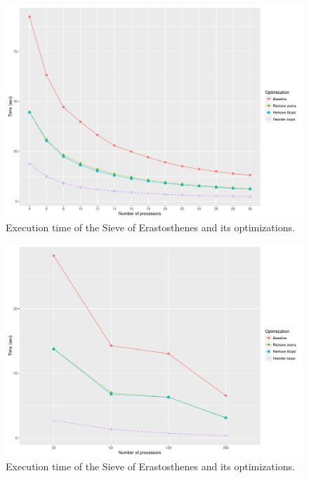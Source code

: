 \documentclass[10pt]{scrartcl}
\begin{document}
\begin{figure}
  \centering
  \includegraphics[width=\textwidth]{plot}
  \caption{Execution time of the Sieve of Erastosthenes and its optimizations.}\label{fig:plot}
\end{figure}

\begin{figure}
  \centering
  \includegraphics[width=\textwidth]{plot2}
  \caption{Execution time of the Sieve of Erastosthenes and its optimizations.}\label{fig:plot2}
\end{figure}
\end{document}
